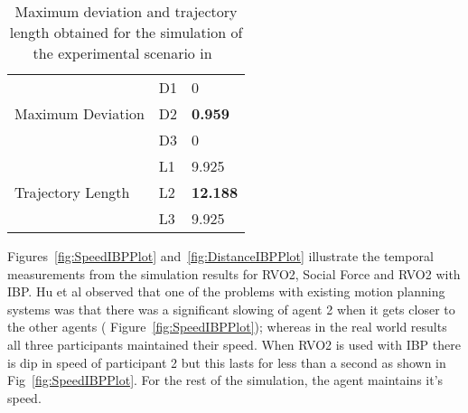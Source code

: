 \begin{table}[h]
\label{tab:SimulationDistanceDeviation}
\centering
        \begin{tabular}{p{1.5in}   p{0.75in}   p{0.75in}}
            \hline
            \multirow{3}{1.5in}{Maximum Deviation} & \multicolumn{1}{l}{D1} & \multicolumn{1}{l}{0}
            \\%
                                    & \multicolumn{1}{l}{D2} & \multicolumn{1}{l}{\textbf{0.959}}
            \\%
                                    & \multicolumn{1}{l}{D3} & \multicolumn{1}{l}{0}
            \\%

            \hline

            \multirow{3}{1.5in}{Trajectory Length} & \multicolumn{1}{l}{L1} & \multicolumn{1}{l}{9.925}
            \\%
                                    & \multicolumn{1}{l}{L2} & \multicolumn{1}{l}{\textbf{12.188}}
            \\%
                                    & \multicolumn{1}{l}{L3} & \multicolumn{1}{l}{9.925}
            \\%

            \hline
            \hline
        \end{tabular}
    \caption{Maximum deviation and trajectory length obtained for the simulation of the experimental scenario in~\cite{hunanThesis}}
    \label{tab:IBPDistanceDeviation}
\end{table}

Figures~\ref{fig:SpeedIBPPlot} and~\ref{fig:DistanceIBPPlot} illustrate the temporal measurements from the simulation results for RVO2, Social Force and RVO2 with IBP. Hu et al observed that one of the problems with existing motion planning systems was that there was a significant slowing of agent 2 when it gets closer to the other agents ( Figure~\ref{fig:SpeedIBPPlot}); whereas in the real world results all three participants maintained their speed. When RVO2 is used with IBP there is dip in speed of participant 2 but this lasts for less than a second as shown in Fig~\ref{fig:SpeedIBPPlot}. For the rest of the simulation, the agent maintains it's speed.

